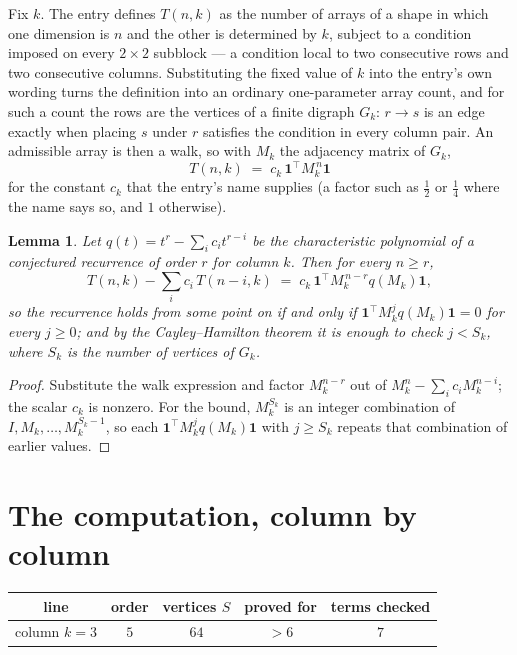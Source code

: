 \documentclass[11pt,a4paper]{article}
\theoremstyle{plain}
\newtheorem{lemma}[theorem]{Lemma}
\theoremstyle{definition}
\begin{document}
Fix $k$. The entry defines $T(n,k)$ as the number of arrays of a shape in which one dimension
is $n$ and the other is determined by $k$, subject to a condition imposed on every
$2\times2$ subblock --- a condition local to two consecutive rows and two consecutive columns.
Substituting the fixed value of $k$ into the entry's own wording turns the definition into an
ordinary one-parameter array count, and for such a count the rows are the vertices of a finite
digraph $G_k$: $r\to s$ is an edge exactly when placing $s$ under $r$ satisfies the condition
in every column pair. An admissible array is then a walk, so with $M_k$ the adjacency matrix
of $G_k$,
\[
T(n,k)\;=\;c_k\,\mathbf{1}^{\!\top}M_k^{\,n}\mathbf{1}
\]
for the constant $c_k$ that the entry's name supplies (a factor such as $\tfrac12$ or
$\tfrac14$ where the name says so, and $1$ otherwise).

\begin{lemma}\label{lem:crit}
Let $q(t)=t^{r}-\sum_i c_it^{r-i}$ be the characteristic polynomial of a conjectured
recurrence of order $r$ for column $k$. Then for every $n\ge r$,
\[
T(n,k)-\sum_i c_i\,T(n-i,k)\;=\;c_k\,\mathbf{1}^{\!\top}M_k^{\,n-r}q(M_k)\mathbf{1},
\]
so the recurrence holds from some point on if and only if
$\mathbf{1}^{\!\top}M_k^{j}q(M_k)\mathbf{1}=0$ for every $j\ge0$; and by the
Cayley--Hamilton theorem it is enough to check $j<S_k$, where $S_k$ is the number of vertices
of $G_k$.
\end{lemma}

\begin{proof}
Substitute the walk expression and factor $M_k^{n-r}$ out of $M_k^{n}-\sum_ic_iM_k^{n-i}$;
the scalar $c_k$ is nonzero. For the bound, $M_k^{S_k}$ is an integer combination of
$I,M_k,\dots,M_k^{S_k-1}$, so each $\mathbf{1}^{\!\top}M_k^{j}q(M_k)\mathbf{1}$ with
$j\ge S_k$ repeats that combination of earlier values.
\end{proof}

\section{The computation, column by column}

\begin{center}
\begin{tabular}{ccccc}
line & order & vertices $S$ & proved for & terms checked \\ \hline
column $k$$=3$ & $5$ & $64$ & $>6$ & $7$ \\
\end{tabular}
\end{center}
\end{document}
